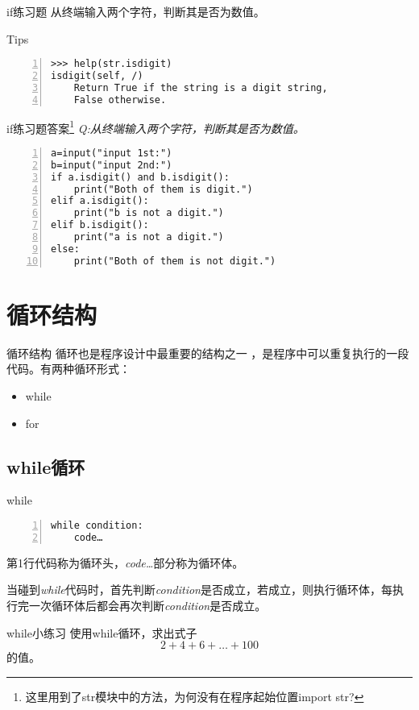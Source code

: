 \documentclass{beamer}
\begin{document}
\begin{frame}[fragile]{if练习题}
从终端输入两个字符，判断其是否为数值。
\begin{block}{Tips}
\begin{Verbatim}[numbers=left,frame=single,rulecolor=\color{red}]
>>> help(str.isdigit)
isdigit(self, /)
    Return True if the string is a digit string, 
    False otherwise.
\end{Verbatim}
\end{block}
\end{frame}
\begin{frame}[fragile]{if练习题答案\footnote{这里用到了str模块中的方法，为何没有在程序起始位置import str?}}
\textit{Q:从终端输入两个字符，判断其是否为数值。}
\begin{Verbatim}[numbers=left,frame=single,rulecolor=\color{red}]
a=input("input 1st:")
b=input("input 2nd:")
if a.isdigit() and b.isdigit():
    print("Both of them is digit.")
elif a.isdigit():
    print("b is not a digit.")
elif b.isdigit():
    print("a is not a digit.")
else:
    print("Both of them is not digit.")
\end{Verbatim}

\end{frame}

\section{循环结构}
\begin{frame}[fragile]{循环结构}
循环也是程序设计中最重要的结构之一
，是程序中可以重复执行的一段代码。有两种循环形式：
\begin{itemize}
\item while
\item for
\end{itemize}


\end{frame}
\subsection{while循环}

\begin{frame}[fragile]{while}
\begin{Verbatim}[numbers=left,frame=single,rulecolor=\color{red}]
while condition:
    code…
\end{Verbatim}
第1行代码称为循环头，\textit{code…}部分称为循环体。

当碰到\textit{while}代码时，首先判断\textit{condition}是否成立，若成立，则执行循环体，每执行完一次循环体后都会再次判断\textit{condition}是否成立。
\end{frame}
\begin{frame}[fragile]{while小练习}
使用while循环，求出式子\begin{equation*}
2+4+6+…+100
\end{equation*}的值。
\end{frame}
\end{document}
